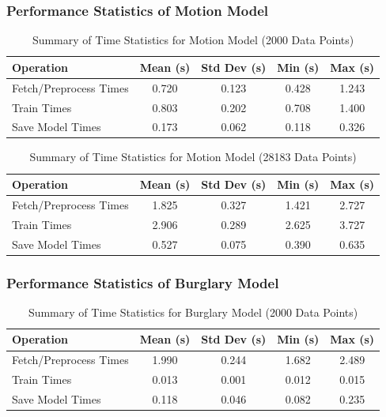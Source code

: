 \documentclass[A4,10pt]{article}
\begin{document}
\subsubsection{Performance Statistics of Motion Model}

\begin{table}[H]
\centering
\begin{tabular}{@{}lcccc@{}}
\toprule
\textbf{Operation} & \textbf{Mean (s)} & \textbf{Std Dev (s)} & \textbf{Min (s)} & \textbf{Max (s)} \\
\midrule
Fetch/Preprocess Times   & 0.720 & 0.123 & 0.428 & 1.243 \\
Train Times         & 0.803 & 0.202 & 0.708 & 1.400 \\
Save Model Times    & 0.173 & 0.062 & 0.118 & 0.326 \\
\bottomrule
\end{tabular}
\caption{Summary of Time Statistics for Motion Model (2000 Data Points)}
\label{tab:motion_model_stats_2000}
\end{table}

\begin{table}[H]
\centering
\begin{tabular}{@{}lcccc@{}}
\toprule
\textbf{Operation} & \textbf{Mean (s)} & \textbf{Std Dev (s)} & \textbf{Min (s)} & \textbf{Max (s)} \\
\midrule
Fetch/Preprocess Times   & 1.825 & 0.327 & 1.421 & 2.727 \\
Train Times         & 2.906 & 0.289 & 2.625 & 3.727 \\
Save Model Times    & 0.527 & 0.075 & 0.390 & 0.635 \\
\bottomrule
\end{tabular}
\caption{Summary of Time Statistics for Motion Model (28183 Data Points)}
\label{tab:motion_model_stats_28183}
\end{table}

\subsubsection*{Performance Statistics of Burglary Model}

\begin{table}[H]
\centering
\begin{tabular}{@{}lcccc@{}}
\toprule
\textbf{Operation} & \textbf{Mean (s)} & \textbf{Std Dev (s)} & \textbf{Min (s)} & \textbf{Max (s)} \\
\midrule
Fetch/Preprocess Times   & 1.990 & 0.244 & 1.682 & 2.489 \\
Train Times   & 0.013 & 0.001 & 0.012 & 0.015 \\
Save Model Times    & 0.118 & 0.046 & 0.082 & 0.235 \\
\bottomrule
\end{tabular}
\caption{Summary of Time Statistics for Burglary Model (2000 Data Points)}
\label{tab:burglary_model_stats_2000}
\end{table}
\end{document}
